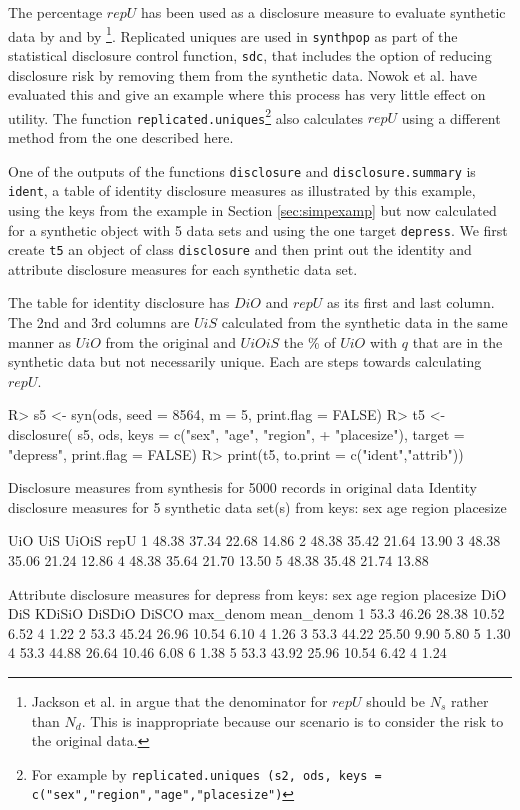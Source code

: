\documentclass[12pt]{article}
\renewcommand{\baselinestretch}{1.5} %
\begin{document}
The percentage  $repU$ has been used as a disclosure measure to evaluate synthetic data by \cite{jackson_rss} and by \cite{raab22} \footnote{Jackson et al. in \cite{jackson_rss} argue that the denominator for $repU$ should be $N_s$ rather than $N_d$. This is inappropriate because our scenario is to consider the risk to the original data.}.
Replicated uniques are used in \texttt{synthpop} as part of the statistical disclosure control function, \texttt{sdc}, that includes the option of reducing disclosure risk by removing them from the synthetic data. Nowok et al. \cite{nowok_repu} have evaluated this and give an example where this process has very little effect on utility. The function  \texttt{replicated.uniques}\footnote{For example by \texttt{replicated.uniques (s2, ods,  keys = c("sex","region","age","placesize")} } also calculates $repU$ using a different method from the one described here.

One of the outputs of the functions \texttt{disclosure} and \texttt{disclosure.summary} is \texttt{ident}, a table of identity disclosure measures as illustrated by this example, using the keys from the example in Section \ref{sec:simpexamp} but now calculated for a synthetic object with 5 data sets and using the one target \texttt{depress}. We first create \texttt{t5} an object of class \texttt{disclosure} and then print out the identity and attribute  disclosure measures for each synthetic data set.

The table for identity disclosure has $DiO$ and $repU$ as its first and last column. The 2nd and 3rd columns are $UiS$ calculated from the synthetic data in the same manner as $UiO$ from the original and $UiOiS$ the \% of $UiO$ with $q$ that are in the synthetic data but not necessarily unique. Each are steps towards calculating $repU$.
\renewcommand{\baselinestretch}{1.0}
\begin{Schunk}
\begin{Sinput}
R> s5 <- syn(ods, seed = 8564, m = 5, print.flag = FALSE)
R> t5 <- disclosure( s5, ods, keys =  c("sex", "age", "region",
+      "placesize"), target = "depress", print.flag = FALSE)
R> print(t5, to.print = c("ident","attrib"))
\end{Sinput}
\begin{Soutput}
Disclosure measures from synthesis for 5000 records in original data
Identity disclosure measures for 5 synthetic data set(s) from keys:
 sex age region placesize 

    UiO   UiS UiOiS  repU
1 48.38 37.34 22.68 14.86
2 48.38 35.42 21.64 13.90
3 48.38 35.06 21.24 12.86
4 48.38 35.64 21.70 13.50
5 48.38 35.48 21.74 13.88

Attribute disclosure measures for depress from keys: sex age region placesize 
   DiO   DiS KDiSiO DiSDiO DiSCO max_denom mean_denom
1 53.3 46.26  28.38  10.52  6.52         4       1.22
2 53.3 45.24  26.96  10.54  6.10         4       1.26
3 53.3 44.22  25.50   9.90  5.80         5       1.30
4 53.3 44.88  26.64  10.46  6.08         6       1.38
5 53.3 43.92  25.96  10.54  6.42         4       1.24
\end{Soutput}
\end{Schunk}
\renewcommand{\baselinestretch}{1.5}
\end{document}
